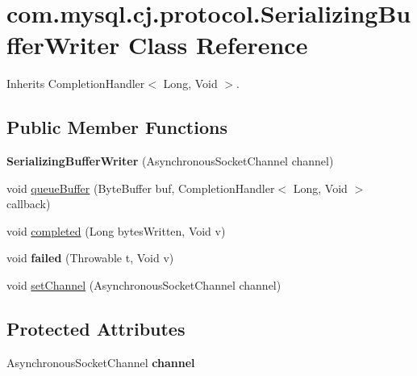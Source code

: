 \hypertarget{classcom_1_1mysql_1_1cj_1_1protocol_1_1_serializing_buffer_writer}{}\section{com.\+mysql.\+cj.\+protocol.\+Serializing\+Buffer\+Writer Class Reference}
\label{classcom_1_1mysql_1_1cj_1_1protocol_1_1_serializing_buffer_writer}


Inherits Completion\+Handler$<$ Long, Void $>$.

\subsection*{Public Member Functions}
\begin{DoxyCompactItemize}
\item 
\mbox{\label{classcom_1_1mysql_1_1cj_1_1protocol_1_1_serializing_buffer_writer_a9e0d4a42d01bb141b8a2ab1b2505c7ab}} 
{\bfseries Serializing\+Buffer\+Writer} (Asynchronous\+Socket\+Channel channel)
\item 
void \mbox{\hyperlink{classcom_1_1mysql_1_1cj_1_1protocol_1_1_serializing_buffer_writer_af340d231ae86b9546e151aae7515f4e3}{queue\+Buffer}} (Byte\+Buffer buf, Completion\+Handler$<$ Long, Void $>$ callback)
\item 
void \mbox{\hyperlink{classcom_1_1mysql_1_1cj_1_1protocol_1_1_serializing_buffer_writer_a5cedb5f89370707b473b5e8619c7ccf1}{completed}} (Long bytes\+Written, Void v)
\item 
\mbox{\label{classcom_1_1mysql_1_1cj_1_1protocol_1_1_serializing_buffer_writer_ad46b2551c4658e8281f80788a7b7ab32}} 
void {\bfseries failed} (Throwable t, Void v)
\item 
void \mbox{\hyperlink{classcom_1_1mysql_1_1cj_1_1protocol_1_1_serializing_buffer_writer_ac59dda63c81fa3c5f00f82924b1c63c5}{set\+Channel}} (Asynchronous\+Socket\+Channel channel)
\end{DoxyCompactItemize}
\subsection*{Protected Attributes}
\begin{DoxyCompactItemize}
\item 
\mbox{\label{classcom_1_1mysql_1_1cj_1_1protocol_1_1_serializing_buffer_writer_a2c945e406ea10c40aa113a7c111570c6}} 
Asynchronous\+Socket\+Channel {\bfseries channel}
\end{DoxyCompactItemize}


